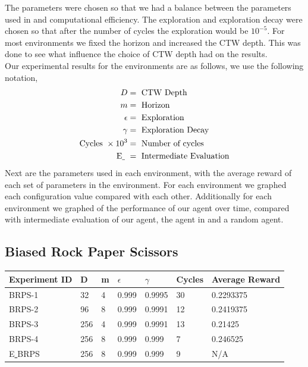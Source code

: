 \documentclass{article}
\theoremstyle{definition}
\newtheorem{primary statistics}[definition]{Primary Statistics}
\newtheorem{auxiliary statistics}[definition]{Auxiliary Statistics}
\begin{document}
The parameters were chosen so that we had a balance between the parameters used in \citep{veness2011monte} and computational efficiency. The exploration and exploration decay were chosen so that after the number of cycles the exploration would be $10^{-5}$. For most environments we fixed the horizon and increased the CTW depth. This was done to see what influence the choice of CTW depth had on the results. \\

Our experimental results for the environments are as follows, we use the following notation,
 \begin{align*}
     D &= \text{ CTW Depth} \\
     m &= \text{ Horizon} \\
     \epsilon &= \text{ Exploration} \\
     \gamma &= \text{ Exploration Decay} \\
     \text{Cycles }\times 10^3 &= \text{ Number of cycles }  \\
     \text{E\underline{ } } &= \text{ Intermediate Evaluation}
 \end{align*}
Next are the parameters used in each environment, with the average reward of each set of parameters in the environment. For each environment we graphed each configuration value compared with each other. Additionally for each environment we graphed of the performance of our agent over time, compared with intermediate evaluation of our agent, the agent in \citep{veness2011monte} and a random agent.


\newpage

\subsection{Biased Rock Paper Scissors}
\begin{tabular}{|l|l|l|l|l|l|l|}
\hline \centering
 Experiment ID& D & m & $\epsilon$ & $\gamma$ & Cycles & Average Reward \\ \hline
BRPS-1        & 32        & 4           & 0.999       & 0.9995            & 30     & 0.2293375        \\ \hline
BRPS-2        & 96        & 8           & 0.999       & 0.9991            & 12     & 0.2419375       \\ \hline
BRPS-3        & 256       & 4           & 0.999       & 0.9991            & 13     & 0.21425        \\ \hline
BRPS-4        & 256       & 8           & 0.999       & 0.999             & 7      & 0.246525  \\ \hline  
E\underline{ }BRPS        & 256       & 8           & 0.999       & 0.999             & 9      & N/A  \\ \hline      
\end{tabular}
\end{document}
